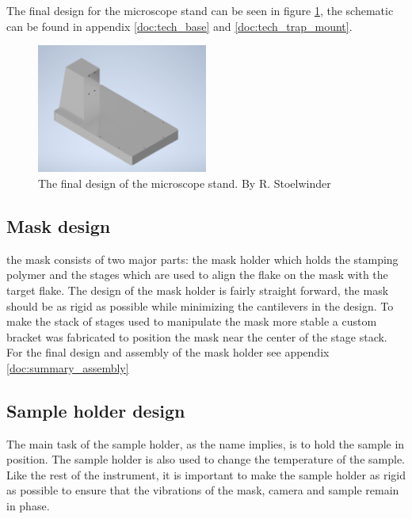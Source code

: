 \documentclass[10pt]{article}
\begin{document}
The final design for the microscope stand can be seen in figure \ref{fig:trap_stand}, the schematic can be found in appendix \ref{doc:tech_base} and \ref{doc:tech_trap_mount}.\\

\begin{figure}[htp]
  \centering
  \includegraphics[width=0.5\textwidth]{img/stand_design/microscope_stand.png}
  \caption{The final design of the microscope stand. By R. Stoelwinder}
  \label{fig:trap_stand}
\end{figure}

\clearpage
\subsection{Mask design}

the mask consists of two major parts: the mask holder which holds the stamping polymer and the stages which are used to align the flake on the mask with the target flake.
The design of the mask holder is fairly straight forward, the mask should be as rigid as possible while minimizing the cantilevers in the design.
To make the stack of stages used to manipulate the mask more stable a custom bracket was fabricated to position the mask near the center of the stage stack.
For the final design and assembly of the mask holder see appendix \ref{doc:summary_assembly}\\

\subsection{Sample holder design}
The main task of the sample holder, as the name implies, is to hold the sample in position. 
The sample holder is also used to change the temperature of the sample.
Like the rest of the instrument, it is important to make the sample holder as rigid as possible to ensure that the vibrations of the mask, camera and sample remain in phase.\\
\end{document}
